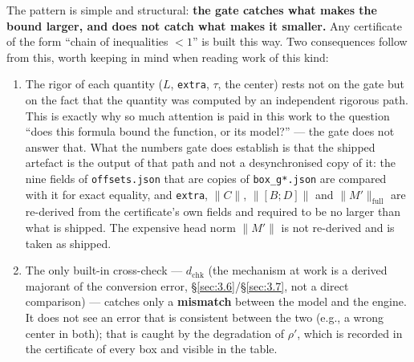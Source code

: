 The pattern is simple and structural: \textbf{the gate catches what makes the
bound larger, and does not catch what makes it smaller.} Any certificate
of the form ``chain of inequalities $< 1$'' is built this way. Two consequences
follow from this, worth keeping in mind when reading work of this kind:

\begin{enumerate}
\item[1.] The rigor of each quantity ($L$, \texttt{extra}, $\tau$, the center) rests not on
  the gate but on the fact that the quantity was computed by an
  independent rigorous path. This is exactly why so much attention is
  paid in this work to the question ``does this formula bound the
  function, or its model?'' --- the gate does not answer that. What the
  numbers gate does establish is that the shipped artefact is the output
  of that path and not a desynchronised copy of it: the nine fields of
  \texttt{offsets.json} that are copies of \texttt{box\_g*.json} are compared with
  it for exact equality, and \texttt{extra}, $\|C\|$, $\|[B;D]\|$ and
  $\|M'\|_{\mathrm{full}}$ are re-derived from the certificate's own fields and
  required to be no larger than what is shipped. The expensive head norm
  $\|M'\|$ is not re-derived and is taken as shipped.
\item[2.] The only built-in cross-check --- $d_{\mathrm{chk}}$ (the mechanism at work is a
  derived majorant of the conversion error, \S\ref{sec:3.6}/\S\ref{sec:3.7}, not a direct
  comparison) --- catches only a \textbf{mismatch} between the model and the
  engine. It does not see an error that is consistent between the two
  (e.g., a wrong center in both); that is caught by the degradation of
  $\rho'$, which is recorded in the certificate of every box and visible in
  the table.
\end{enumerate}



